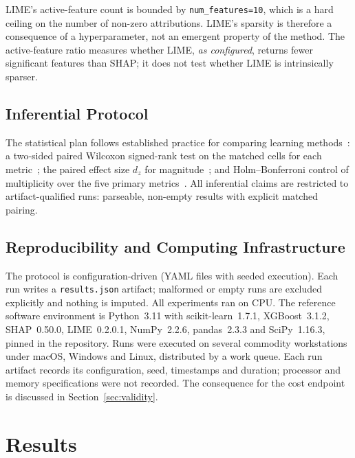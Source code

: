 \documentclass{cleiej}
\begin{document}
LIME's active-feature count is bounded by \texttt{num\_features=10}, which
is a hard ceiling on the number of non-zero attributions. LIME's sparsity
is therefore a consequence of a hyperparameter, not an emergent property of
the method. The active-feature ratio measures whether LIME, \emph{as
configured}, returns fewer significant features than SHAP; it does not test
whether LIME is intrinsically sparser.

\subsection{Inferential Protocol}
\label{sec:inference}

The statistical plan follows established practice for comparing learning
methods~\cite{demsar2006statistical}: a two-sided paired Wilcoxon
signed-rank test on the matched cells for each
metric~\cite{wilcoxon1945individual}; the paired effect size $d_z$ for
magnitude~\cite{lakens2013calculating}; and Holm--Bonferroni control of
multiplicity over the five primary metrics~\cite{holm1979simple}. All
inferential claims are restricted to artifact-qualified runs: parseable,
non-empty results with explicit matched pairing.

\subsection{Reproducibility and Computing Infrastructure}
\label{sec:infrastructure}

The protocol is configuration-driven (YAML files with seeded execution).
Each run writes a \texttt{results.json} artifact; malformed or empty runs
are excluded explicitly and nothing is imputed. All experiments ran on CPU.
The reference software environment is Python~3.11 with scikit-learn~1.7.1,
XGBoost~3.1.2, SHAP~0.50.0, LIME~0.2.0.1, NumPy~2.2.6, pandas~2.3.3 and
SciPy~1.16.3, pinned in the repository. Runs were executed on several
commodity workstations under macOS, Windows and Linux, distributed by a
work queue. Each run artifact records its configuration, seed, timestamps
and duration; processor and memory specifications were not recorded. The
consequence for the cost endpoint is discussed in
Section~\ref{sec:validity}.

\section{Results}
\label{sec:results}
\end{document}
